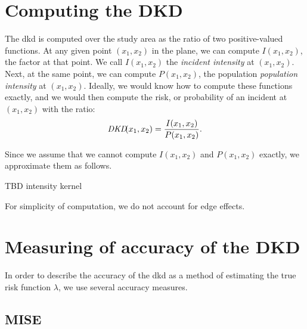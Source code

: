 \section{Computing the DKD}
\label{sec:method:computing}

The \gls{dkd} is computed over the study area as the ratio of two positive-valued functions.
At any given point \((x_1, x_2)\) in the plane, we can compute \(I(x_1, x_2)\), the \gls{factor} at that point.
We call \(I(x_1, x_2)\) the \textit{incident intensity} at \((x_1, x_2)\).
Next, at the same point, we can compute \(P(x_1, x_2)\), the population \textit{population intensity} at \((x_1, x_2)\).
Ideally, we would know how to compute these functions exactly, and we would then compute the risk, or probability of an incident at \((x_1, x_2)\) with the ratio:
\begin{equation}
    \mbox{\itshape DKD}\!(x_1, x_2) = \frac{I(x_1, x_2)}{P(x_1, x_2)}.
\end{equation}

Since we assume that we cannot compute \(I(x_1, x_2)\) and \(P(x_1, x_2)\) exactly, we approximate them as follows.

TBD intensity kernel

For simplicity of computation, we do not account for edge effects.


\section{Measuring of accuracy of the DKD}
\label{sec:method:accuracy}

In order to describe the accuracy of the \gls{dkd} as a method of estimating the true risk function \(\lambda\),
we use several accuracy measures.

\subsection{MISE}
\label{subsec:method:mise}


